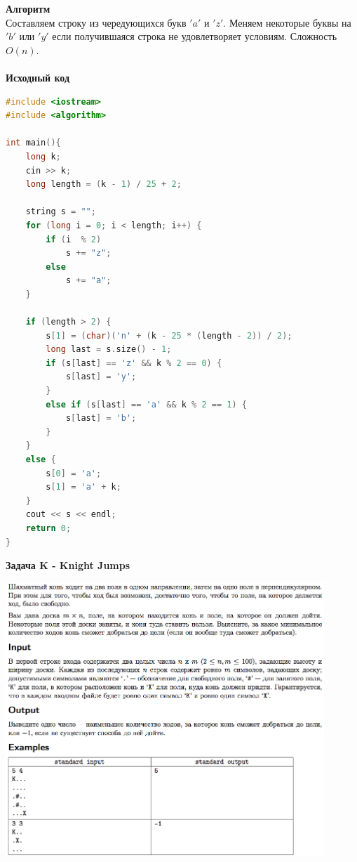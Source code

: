 \documentclass[a4paper,12pt]{article}
\begin{document}
\textbf{{\large Алгоритм}} \\
Составляем строку из чередующихся букв $'a'$ и $'z'$. Меняем некоторые буквы на $'b'$ или $'y'$ если получившаяся строка не удовлетворяет условиям. Сложность $O(n)$. \\ 
\\
\textbf{{\large Исходный код}}
\begin{lstlisting}[language=C++]
#include <iostream>
#include <algorithm>

int main(){
    long k;
    cin >> k;
    long length = (k - 1) / 25 + 2;
    
    string s = "";
    for (long i = 0; i < length; i++) {
        if (i  % 2)
            s += "z";
        else
            s += "a";
    }
    
    if (length > 2) {
        s[1] = (char)('n' + (k - 25 * (length - 2)) / 2);
        long last = s.size() - 1;
        if (s[last] == 'z' && k % 2 == 0) {
            s[last] = 'y';
        }
        else if (s[last] == 'a' && k % 2 == 1) {
            s[last] = 'b';
        }
    }
    else {
        s[0] = 'a';
        s[1] = 'a' + k;
    }
    cout << s << endl;
    return 0;
}
\end{lstlisting}
\newpage
\textbf{{\large Задача K - Knight Jumps}} \\
\begin{center}
\includegraphics[width=0.9\textwidth]{OC_America/OC_America_K.png}\\ [1cm]
\end{center}
\newpage
\end{document}
